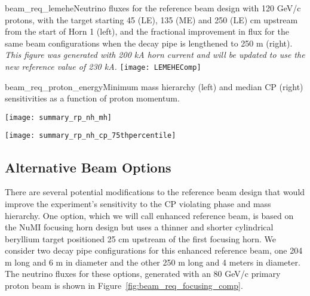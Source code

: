 \begin{cdrfigure} {beam_req_lemehe}{Neutrino fluxes for the 
    reference beam design with 120 GeV/c protons, with the target starting 45 (LE), 135 (ME) 
    and 250 (LE) cm upstream from the start of Horn 1 (left), and the 
   fractional improvement in flux for the same beam configurations 
    when the decay pipe is lengthened to 250 m (right). {\it This 
      figure was generated with 200 kA horn current and will be 
      updated to use the new reference value of 230 kA.}}
    \texttt{[image: LEMEHEComp]}
  \end{cdrfigure}

\begin{cdrfigure}{beam_req_proton_energy}{Minimum mass hierarchy (left) and
    median CP (right) sensitivities as a function of proton momentum.} 
\centering 
\begin{minipage}{0.45\textwidth}
\centering 
\texttt{[image: summary\_rp\_nh\_mh]}
\end{minipage}\hfill 
\begin{minipage}{0.45\textwidth}
\centering 
\texttt{[image: summary\_rp\_nh\_cp\_75thpercentile]}
\end{minipage}
\end{cdrfigure}

\subsection{Alternative Beam Options}
\label{subsec:alternative-focusing-systems}

There are several potential modifications to the reference beam design that would improve the experiment's sensitivity to the CP violating phase and mass hierarchy. 
One option, which we will call enhanced reference beam, is based on 
the NuMI focusing horn design but uses a thinner and shorter 
cylindrical beryllium target positioned 25 cm upstream of the first 
focusing horn. We consider two decay pipe configurations for this 
enhanced reference beam, one 204 m long and 6 m in diameter and the other 
250 m long and 4 meters in diameter.  The neutrino fluxes for these 
options, generated with an 80 GeV/c primary proton beam is shown in 
Figure~\ref{fig:beam_req_focusing_comp}. 
  
